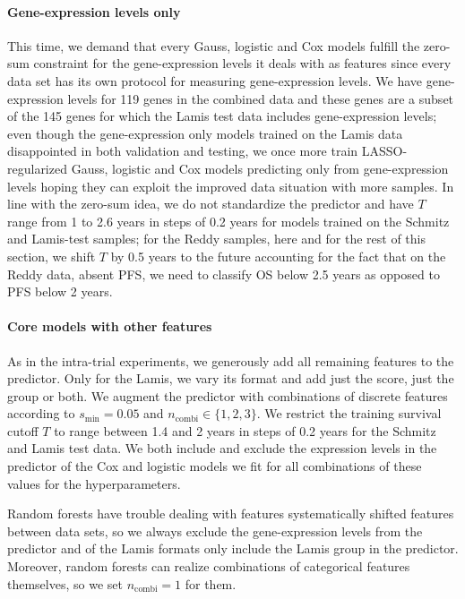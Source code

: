 \paragraph{Gene-expression levels only}
This time, we demand that every Gauss, logistic and Cox models fulfill the zero-sum constraint for 
the gene-expression levels it deals with as features since every data set has its own protocol for 
measuring gene-expression levels. We have gene-expression levels for \num{119} genes in the 
combined data and these genes are a subset of the \num{145} genes for which the Lamis test data 
includes gene-expression levels; even though the gene-expression only models trained on the Lamis 
data disappointed in both validation and testing, we once more train LASSO-regularized Gauss, 
logistic and Cox models predicting only from gene-expression levels hoping they can exploit the 
improved data situation with more samples. In line with the zero-sum idea, we do not standardize 
the predictor and have $T$ range from \num{1} to \num{2.6} years in steps of \num{0.2} years for 
models trained on the Schmitz and Lamis-test samples; for the Reddy samples, here and for the rest 
of this section, we shift $T$ by
\num{0.5} years to the future accounting for the fact that on the Reddy data, absent PFS, we need 
to classify OS below \num{2.5} years as opposed to PFS below \num{2} years.

\paragraph{Core models with other features}
As in the intra-trial experiments, we generously add all remaining features to the predictor. Only 
for the Lamis, we vary its format and add just the score, just the group or both. We augment the 
predictor with combinations of discrete features according to $s_\text{min} = \num{0.05}$ and 
$n_\text{combi} \in \{ 1, 2, 3 \}$. We restrict the training survival cutoff $T$ to range between 
\num{1.4} and \num{2} years in steps of \num{0.2} years for the Schmitz and Lamis test data. We 
both include and exclude the expression levels in the predictor of the Cox and logistic 
models we fit for all combinations of these values for the hyperparameters.

Random forests have trouble dealing with features systematically shifted features between data sets, so 
we always exclude the gene-expression levels from the predictor and of the Lamis formats only 
include the Lamis group in the predictor. Moreover, random forests can realize combinations of 
categorical features themselves, so we set $n_\text{combi} = 1$ for them.

